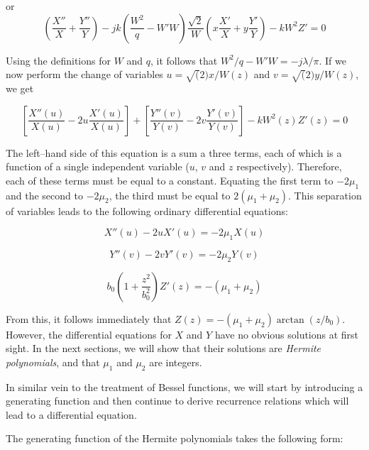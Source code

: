 or
\begin{equation}
\left(\frac{X''}{X}+\frac{Y''}{Y}\right)  
- j k  \left(\frac{W^2}{q} - W'W\right)\frac{\sqrt{2}}{W}\left(x\frac{X'}{X}+y\frac{Y'}{Y}\right)
-kW^2Z' = 0
\end{equation} 

Using the definitions for $W$ and $q$, it follows that $W^2/q - W'W = -j \lambda / \pi$. If we now perform the change of variables $u = \sqrt(2) x / W(z)$ and  $v = \sqrt(2) y / W(z)$, we get

\begin{equation}
\left[{\frac{X''(u)}{X(u)} - 2 u\frac{X'(u)}{X(u)}}\right] + 
\left[{\frac{Y''(v)}{Y(v)} - 2 v\frac{Y'(v)}{Y(v)}}\right] -kW^2(z)Z'(z) = 0
\end{equation} 

The left--hand side of this equation is a sum a three terms, each of which is a function of a single independent variable ($u$, $v$ and $z$ respectively). Therefore, each of these terms must be equal to a constant. Equating the first term to $-2\mu_1$ and the second to $-2\mu_2$, the third must be equal to $2(\mu_1+\mu_2)$. This separation of variables leads to the following ordinary differential equations:

\begin{equation}
X''(u) - 2 u X'(u) = - 2 \mu_1 X(u) \label{eq-diff-hermite-0}
\end{equation} 

\begin{equation}
Y''(v) - 2 v Y'(v) = - 2 \mu_2 Y(v)
\end{equation} 

\begin{equation}
b_0\left(1 + \frac{z^2}{b_0^2}\right)Z'(z) = -(\mu_1+\mu_2)
\end{equation} 

From this, it follows immediately that $Z(z) = -(\mu_1+\mu_2) \arctan(z/b_0)$. However, the differential equations for $X$ and $Y$ have no obvious solutions at first sight. In the next sections, we will show that their solutions are \emph{Hermite polynomials}, and that $\mu_1$ and $\mu_2$ are integers.

In similar vein to the treatment of Bessel functions, we will start by introducing a generating function and then continue to derive recurrence relations which will lead to a differential equation.


The generating function of the Hermite polynomials takes the following form:

